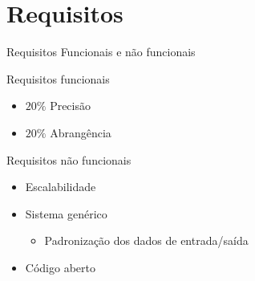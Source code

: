 \section[Requisitos]{Requisitos}
\begin{frame}{Requisitos} {Funcionais e não funcionais}
\begin{block}{Requisitos funcionais}
\begin{itemize}
	\item $20\%$ Precisão
	\item $20\%$ Abrangência
\end{itemize}
\end{block}

\begin{block}{Requisitos não funcionais}
\begin{itemize}
	\item Escalabilidade
	\item Sistema genérico
	\begin{itemize}
		\item Padronização dos dados de entrada/saída
	\end{itemize}
	\item Código aberto
\end{itemize}
\end{block}
\end{frame}

